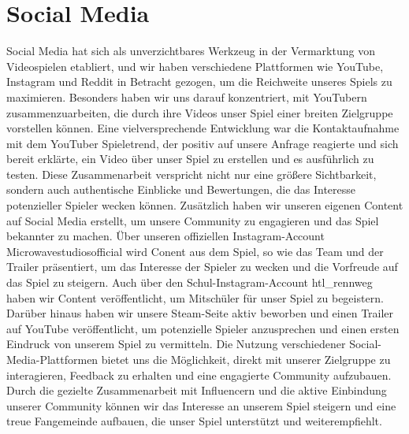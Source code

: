 
\section{Social Media}\label{sec:social-media}

\renewcommand{\kapitelautor}{Autor: Nils Hubmann} %


%
Social Media hat sich als unverzichtbares Werkzeug in der Vermarktung von Videospielen etabliert, und wir haben verschiedene Plattformen wie YouTube, Instagram und Reddit in Betracht gezogen, um die Reichweite unseres Spiels zu maximieren.
Besonders haben wir uns darauf konzentriert, mit YouTubern zusammenzuarbeiten, die durch ihre Videos unser Spiel einer breiten Zielgruppe vorstellen können.
Eine vielversprechende Entwicklung war die Kontaktaufnahme mit dem YouTuber Spieletrend, der positiv auf unsere Anfrage reagierte und sich bereit erklärte,
ein Video über unser Spiel zu erstellen und es ausführlich zu testen. Diese Zusammenarbeit verspricht nicht nur eine größere Sichtbarkeit, sondern auch authentische Einblicke und Bewertungen,
die das Interesse potenzieller Spieler wecken können. Zusätzlich haben wir unseren eigenen Content auf Social Media erstellt, um unsere Community zu engagieren und das Spiel bekannter zu machen.
Über unseren offiziellen Instagram-Account Microwavestudiosofficial wird Conent aus dem Spiel, so wie das Team und der Trailer präsentiert, um das Interesse der Spieler zu wecken und die Vorfreude auf das Spiel zu steigern.
Auch über den Schul-Instagram-Account htl\_rennweg haben wir Content veröffentlicht, um Mitschüler für unser Spiel zu begeistern.
Darüber hinaus haben wir unsere Steam-Seite aktiv beworben und einen Trailer auf YouTube veröffentlicht, um potenzielle Spieler anzusprechen und einen ersten Eindruck von unserem Spiel zu vermitteln.
Die Nutzung verschiedener Social-Media-Plattformen bietet uns die Möglichkeit, direkt mit unserer Zielgruppe zu interagieren, Feedback zu erhalten und eine engagierte Community aufzubauen.
Durch die gezielte Zusammenarbeit mit Influencern und die aktive Einbindung unserer Community können wir das Interesse an unserem Spiel steigern und eine treue Fangemeinde aufbauen, die unser Spiel unterstützt und weiterempfiehlt.
%

\renewcommand{\kapitelautor}{}
